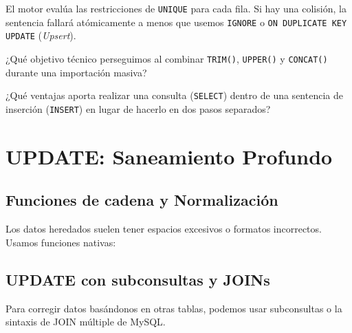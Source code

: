 \documentclass[12pt,a4paper]{article}
\begin{document}


\begin{tcolorbox}[title=Punto Crítico: Restricciones UNIQUE]
El motor evalúa las restricciones de \texttt{UNIQUE} para cada fila. Si hay una colisión, la sentencia fallará atómicamente a menos que usemos \texttt{IGNORE} o \texttt{ON DUPLICATE KEY UPDATE} (\textit{Upsert}).
\end{tcolorbox}



\begin{tcolorbox}[title=Reflexión 2]
¿Qué objetivo técnico perseguimos al combinar \texttt{TRIM()}, \texttt{UPPER()} y \texttt{CONCAT()} durante una importación masiva?
\end{tcolorbox}

\begin{tcolorbox}[title=Reflexión 3]
¿Qué ventajas aporta realizar una consulta (\texttt{SELECT}) dentro de una sentencia de inserción (\texttt{INSERT}) en lugar de hacerlo en dos pasos separados?
\end{tcolorbox}

\section{UPDATE: Saneamiento Profundo}
\subsection{Funciones de cadena y Normalización}
Los datos heredados suelen tener espacios excesivos o formatos incorrectos. Usamos funciones nativas:



\subsection{UPDATE con subconsultas y JOINs}
Para corregir datos basándonos en otras tablas, podemos usar subconsultas o la sintaxis de JOIN múltiple de MySQL.



\end{document}
